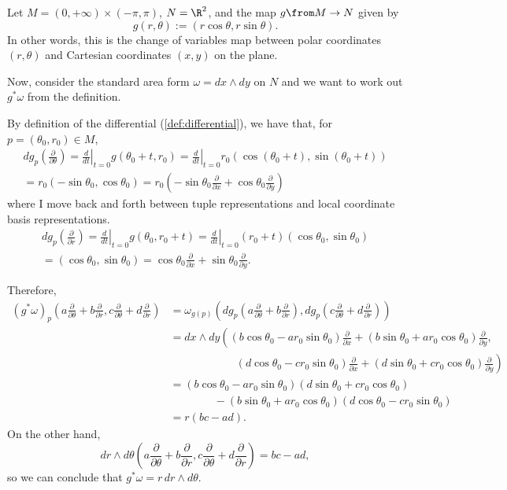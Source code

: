 \begin{example}
	Let $M = (0, +\infty) \times (-\pi, \pi)$, $N = \R^2$, and the map $g\from M \to N$ given by
	\[
		g(r, \theta) := (r \cos \theta, r \sin \theta).
	\]
	In other words, this is the change of variables map between polar coordinates $(r, \theta)$ and Cartesian coordinates $(x,y)$ on the plane.
	
	Now, consider the standard area form $\omega = dx \wedge dy$ on $N$ and we want to work out $g^\ast \omega$ from the definition. 
	
	By definition of the differential (\cref{def:differential}), we have that, for $p = (\theta_0, r_0) \in M$, 
	\begin{multline*}
		dg_p\left(\frac{\partial}{\partial \theta} \right) = \left. \frac{d}{dt} \right|_{t=0} g(\theta_0+t,r_0) = \left. \frac{d}{dt} \right|_{t=0} r_0(\cos(\theta_0+t),\sin(\theta_0+t)) \\
		= r_0(-\sin\theta_0,\cos\theta_0) = r_0\left(-\sin\theta_0 \frac{\partial}{\partial x} + \cos \theta_0 \frac{\partial}{\partial y}\right)
	\end{multline*}
	where I move back and forth between tuple representations and local coordinate basis representations.
	\begin{multline*}
		dg_p\left(\frac{\partial}{\partial r} \right) = \left. \frac{d}{dt} \right|_{t=0} g(\theta_0,r_0+t) = \left. \frac{d}{dt} \right|_{t=0} (r_0+t)(\cos\theta_0,\sin\theta_0) \\
		= (\cos\theta_0,\sin\theta_0) = \cos\theta_0 \frac{\partial}{\partial x} + \sin \theta_0 \frac{\partial}{\partial y}.
	\end{multline*}
	
	Therefore,
	\begin{align*}
		(g^\ast \omega)_p\left(a \frac{\partial}{\partial \theta} + b \frac{\partial}{\partial r}, c \frac{\partial}{\partial \theta} + d \frac{\partial}{\partial r}\right) & = \omega_{g(p)} \left(dg_p\left(a \frac{\partial}{\partial \theta} + b \frac{\partial}{\partial r}\right), dg_p\left(c \frac{\partial}{\partial \theta} + d \frac{\partial}{\partial r}\right)\right) \\
		& = dx \wedge dy \left((b \cos\theta_0 - a r_0\sin\theta_0) \frac{\partial}{\partial x} + (b\sin \theta_0 +ar_0\cos \theta_0) \frac{\partial}{\partial y}, \right. \\
		& \qquad \qquad \qquad \left. (d \cos\theta_0 - c r_0\sin\theta_0) \frac{\partial}{\partial x} + (d\sin \theta_0 +cr_0\cos \theta_0) \frac{\partial}{\partial y}\right) \\
		& = (b \cos\theta_0 - a r_0\sin\theta_0)(d\sin \theta_0 +cr_0\cos \theta_0) \\
		& \qquad \qquad - (b\sin \theta_0 +ar_0\cos \theta_0)(d \cos\theta_0 - c r_0\sin\theta_0) \\
		& = r(bc-ad).
	\end{align*}
	On the other hand,
	\[
		dr \wedge d\theta \left(a \frac{\partial}{\partial \theta} + b \frac{\partial}{\partial r}, c \frac{\partial}{\partial \theta} + d \frac{\partial}{\partial r}\right) = bc-ad,
	\]
	so we can conclude that $g^\ast \omega = r\, dr \wedge d\theta$.
	

\end{example}
